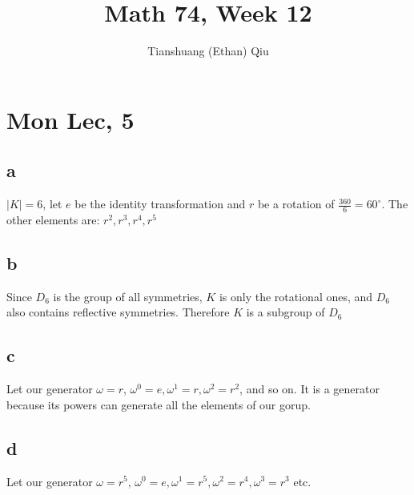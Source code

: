 \documentclass[12pt]{article}
\author{Tianshuang (Ethan) Qiu}
\newcommand{\degrees}{^{\circ}}
\begin{document}
\title{Math 74, Week 12}
\maketitle

\section{Mon Lec, 5}
\subsection{a}
$|K|=6$, let $e$ be the identity transformation and $r$ be a rotation of $\frac{360}{6}=60 \degrees$. The other elements are: $r^2, r^3, r^4, r^5$

\subsection{b}
Since $D_6$ is the group of all symmetries, $K$ is only the rotational ones, and $D_6$ also contains reflective symmetries. Therefore $K$ is a subgroup of $D_6$

\subsection{c}
Let our generator $\omega = r$, $\omega ^ 0 = e, \omega^1 = r, \omega^2 = r^2$, and so on. It is a generator because its powers can generate all the elements of our gorup.

\subsection{d}
Let our generator $\omega = r^5$, $\omega^0 = e, \omega^1 = r^5, \omega^2 = r^4, \omega^3=r^3$ etc.
\end{document}
